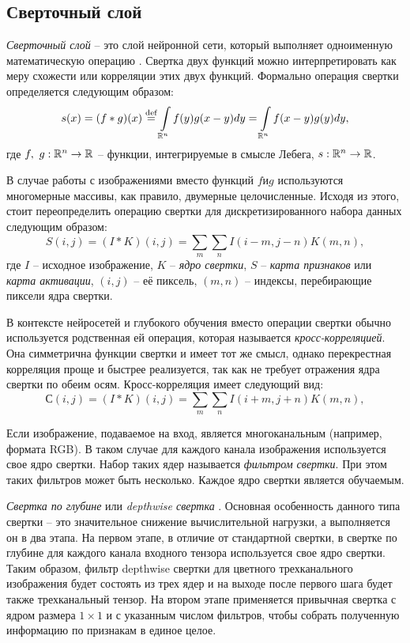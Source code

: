 \subsection{Сверточный слой} \label{par:convolution}
\textit{Сверточный слой} -- это слой нейронной сети, который выполняет одноименную математическую операцию \cite{goodfellow2016deep}. Свертка двух функций можно интерпретировать как меру схожести или корреляции этих двух функций. Формально операция свертки определяется следующим образом:
\begin{equation}
	s(x) = (f*g)(x) \stackrel{\text{def}}{=} \int\limits_{\RR^n} f(y)g(x-y)dy = \int\limits_{\RR^n} f(x-y)g(y)dy,
\end{equation}
где $f,\ g:\RR^n \rightarrow \RR$ -- функции, интегрируемые в смысле Лебега, $s:\RR^n \rightarrow \RR$.

В случае работы с изображениями вместо функций $f \text{и} g$ используются многомерные массивы, как правило, двумерные целочисленные. Исходя из этого, стоит переопределить операцию свертки для дискретизированного набора данных следующим образом:
\begin{equation}
	S(i,j) = (I*K)(i,j) = \sum\limits_m \sum\limits_n I(i-m,j-n)K(m,n),
\end{equation}
где $I$ -- исходное изображение, $K$ -- \textit{ядро свертки}, $S$ -- \textit{карта признаков} или \textit{карта активации}, $(i,j)$ -- её пиксель, $(m,n)$ -- индексы, перебирающие пиксели ядра свертки.

В контексте нейросетей и глубокого обучения вместо операции свертки обычно используется родственная ей операция, которая называется \textit{кросс-корреляцией}. Она симметрична функции свертки и имеет тот же смысл, однако перекрестная корреляция проще и быстрее реализуется, так как не требует отражения ядра свертки по обеим осям. Кросс-корреляция имеет следующий вид:
\begin{equation}
	С(i,j) = (I*K)(i,j) = \sum\limits_m \sum\limits_n I(i+m,j+n)K(m,n),
	\label{eq:cross-correlation}
\end{equation}

Если изображение, подаваемое на вход, является многоканальным (например, формата RGB). В таком случае для каждого канала изображения используется свое ядро свертки. Набор таких ядер называется \textit{фильтром свертки}. При этом таких фильтров может быть несколько. Каждое ядро свертки является обучаемым.

\textit{Свертка по глубине} или \textit{depthwise свертка} \cite{mobilenet}. Основная особенность данного типа свертки -- это значительное снижение вычислительной нагрузки, а выполняется он в два этапа. На первом этапе, в отличие от стандартной свертки, в свертке по глубине для каждого канала входного тензора используется свое ядро свертки. Таким образом, фильтр depthwise свертки для цветного трехканального изображения будет состоять из трех ядер и на выходе после первого шага будет также трехканальный тензор. На втором этапе применяется привычная свертка с ядром размера $1 \times 1$ и с указанным числом фильтров, чтобы собрать полученную информацию по признакам в единое целое.

